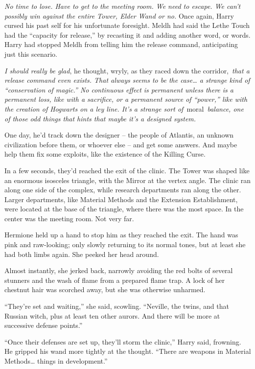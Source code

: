 \emph{No time to lose. Have to get to the meeting room. We need to
escape. We can't possibly win against the entire Tower, Elder Wand or
no.} Once again, Harry cursed his past self for his unfortunate
foresight. Meldh had said the Lethe Touch had the ``capacity for
release,'' by recasting it and adding another word, or words. Harry had
stopped Meldh from telling him the release command, anticipating just
this scenario.

\emph{I should really be glad}, he thought, wryly, as they raced down
the corridor,~\emph{that a release command even exists. That always
seems to be the case\ldots{} a strange kind of ``conservation of
magic.'' No continuous effect is permanent unless there is a permanent
loss, like with a sacrifice, or a permanent source of ``power,'' like
with the creation of Hogwarts on a ley line. It's a strange sort
of}~moral~\emph{balance, one of those odd things that hints that maybe
it's a designed system.}

One day, he'd track down the designer -- the people of Atlantis, an
unknown civilization before them, or whoever else -- and get some
answers. And maybe help them fix some exploits, like the existence of
the Killing Curse.

In a few seconds, they'd reached the exit of the clinic. The Tower was
shaped like an enormous isosceles triangle, with the Mirror at the
vertex angle. The clinic ran along one side of the complex, while
research departments ran along the other. Larger departments, like
Material Methods and the Extension Establishment, were located at the
base of the triangle, where there was the most space. In the center was
the meeting room. Not very far.

Hermione held up a hand to stop him as they reached the exit. The hand
was pink and raw-looking; only slowly returning to its normal tones, but
at least she had both limbs again. She peeked her head around.

Almost instantly, she jerked back, narrowly avoiding the red bolts of
several stunners and the wash of flame from a prepared flame trap. A
lock of her chestnut hair was scorched away, but she was otherwise
unharmed.

``They're set and waiting,'' she said, scowling. ``Neville, the twins,
and that Russian witch, plus at least ten other aurors. And there will
be more at successive defense points.''

``Once their defenses are set up, they'll storm the clinic,'' Harry
said, frowning. He gripped his wand more tightly at the thought. ``There
are weapons in Material Methods\ldots{} things in development.''

